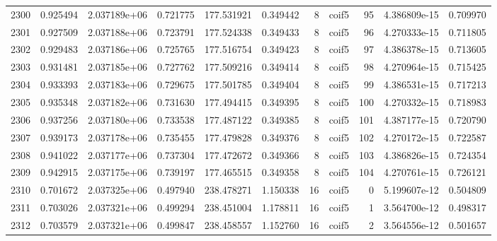 \begin{tabular}{lrrrrrrlrrr}
2300 &    0.925494 &        2.037189e+06 &  0.721775 &              177.531921 &    0.349442 &       8 &        coif5 &     95 &   4.386809e-15 &      0.709970 \\
2301 &    0.927509 &        2.037188e+06 &  0.723791 &              177.524338 &    0.349433 &       8 &        coif5 &     96 &   4.270333e-15 &      0.711805 \\
2302 &    0.929483 &        2.037186e+06 &  0.725765 &              177.516754 &    0.349423 &       8 &        coif5 &     97 &   4.386378e-15 &      0.713605 \\
2303 &    0.931481 &        2.037185e+06 &  0.727762 &              177.509216 &    0.349414 &       8 &        coif5 &     98 &   4.270964e-15 &      0.715425 \\
2304 &    0.933393 &        2.037183e+06 &  0.729675 &              177.501785 &    0.349404 &       8 &        coif5 &     99 &   4.386531e-15 &      0.717213 \\
2305 &    0.935348 &        2.037182e+06 &  0.731630 &              177.494415 &    0.349395 &       8 &        coif5 &    100 &   4.270332e-15 &      0.718983 \\
2306 &    0.937256 &        2.037180e+06 &  0.733538 &              177.487122 &    0.349385 &       8 &        coif5 &    101 &   4.387177e-15 &      0.720790 \\
2307 &    0.939173 &        2.037178e+06 &  0.735455 &              177.479828 &    0.349376 &       8 &        coif5 &    102 &   4.270172e-15 &      0.722587 \\
2308 &    0.941022 &        2.037177e+06 &  0.737304 &              177.472672 &    0.349366 &       8 &        coif5 &    103 &   4.386826e-15 &      0.724354 \\
2309 &    0.942915 &        2.037175e+06 &  0.739197 &              177.465515 &    0.349358 &       8 &        coif5 &    104 &   4.270761e-15 &      0.726121 \\
2310 &    0.701672 &        2.037325e+06 &  0.497940 &              238.478271 &    1.150338 &      16 &        coif5 &      0 &   5.199607e-12 &      0.504809 \\
2311 &    0.703026 &        2.037321e+06 &  0.499294 &              238.451004 &    1.178811 &      16 &        coif5 &      1 &   3.564700e-12 &      0.498317 \\
2312 &    0.703579 &        2.037321e+06 &  0.499847 &              238.458557 &    1.152760 &      16 &        coif5 &      2 &   3.564556e-12 &      0.501657 \\

\end{tabular}
